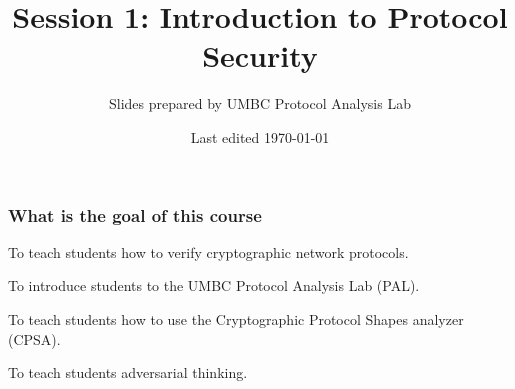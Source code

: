 \documentclass[red]{beamer}
\begin{document}

\title{Session 1: Introduction to Protocol Security}
\author{Slides prepared by UMBC Protocol Analysis Lab}
\date{Last edited \today}
\maketitle

\begin{frame}\frametitle{What is the goal of this course}
\pause
To teach students how to verify cryptographic network protocols.

\pause
To introduce students to the UMBC Protocol Analysis Lab (PAL).

\pause
To teach students how to use the Cryptographic Protocol Shapes analyzer (CPSA).

\pause
To teach students adversarial thinking.

\end{frame}
\end{document}
